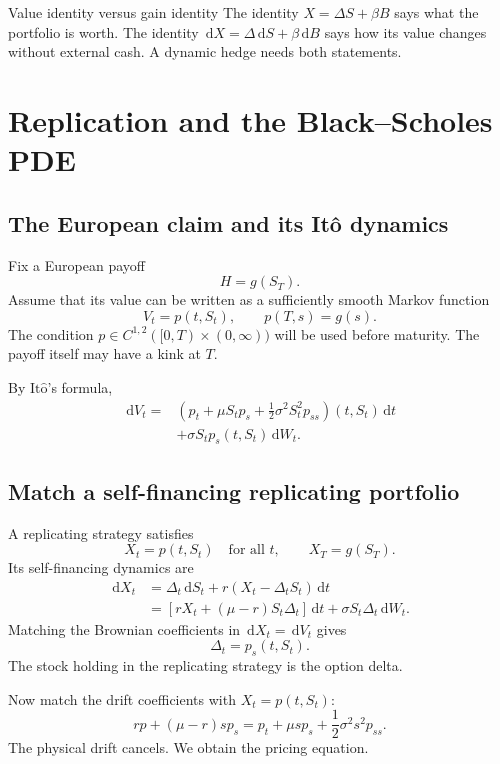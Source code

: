 \documentclass[10pt]{article}
\newcommand{\1}{\mathbf 1}
\newcommand{\dd}{\,\mathrm d}
\newcommand{\Ito}{\mathrm{It\hat{o}}}
\theoremstyle{definition}
\begin{document}
\begin{warningbox}{Value identity versus gain identity}
The identity \(X=\Delta S+\beta B\) says what the portfolio is worth.
The identity
\(\dd X=\Delta\dd S+\beta\dd B\) says how its value changes without external
cash. A dynamic hedge needs both statements.
\end{warningbox}

\section{Replication and the Black--Scholes PDE}

\subsection{The European claim and its It\^o dynamics}

Fix a European payoff
\[
H=g(S_T).
\]
Assume that its value can be written as a sufficiently smooth Markov function
\[
V_t=p(t,S_t),
\qquad
p(T,s)=g(s).
\]
The condition \(p\in C^{1,2}([0,T)\times(0,\infty))\) will be used before
maturity. The payoff itself may have a kink at \(T\).

By \(\Ito\)'s formula,
\[
\boxed{
\begin{aligned}
\dd V_t
={}&\left(
p_t+\mu S_tp_s+\frac12\sigma^2S_t^2p_{ss}
\right)(t,S_t)\dd t\\
&+\sigma S_tp_s(t,S_t)\dd W_t.
\end{aligned}}
\]

\subsection{Match a self-financing replicating portfolio}

A replicating strategy satisfies
\[
X_t=p(t,S_t)
\quad\text{for all }t,
\qquad
X_T=g(S_T).
\]
Its self-financing dynamics are
\[
\begin{aligned}
\dd X_t
&=\Delta_t\dd S_t+r(X_t-\Delta_tS_t)\dd t\\
&=\left[rX_t+(\mu-r)S_t\Delta_t\right]\dd t
+\sigma S_t\Delta_t\dd W_t.
\end{aligned}
\]
Matching the Brownian coefficients in \(\dd X_t=\dd V_t\) gives
\[
\boxed{\Delta_t=p_s(t,S_t).}
\]
The stock holding in the replicating strategy is the option delta.

Now match the drift coefficients with \(X_t=p(t,S_t)\):
\[
rp+(\mu-r)sp_s
=p_t+\mu sp_s+\frac12\sigma^2s^2p_{ss}.
\]
The physical drift cancels. We obtain the pricing equation.
\end{document}
